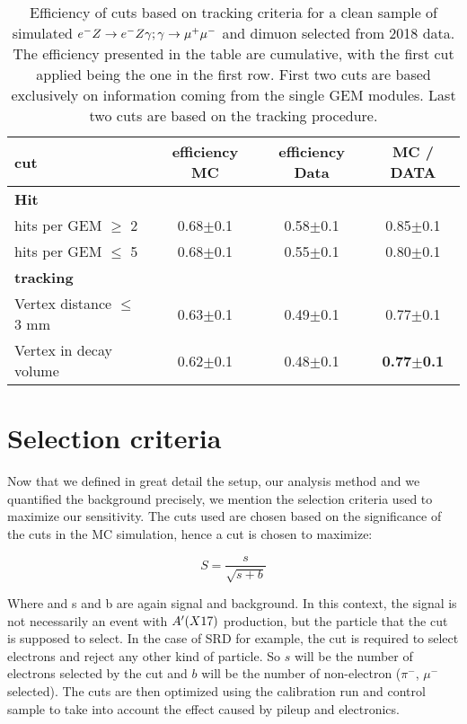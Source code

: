 \begin{center}
\begin{table}
  \begin{tabular}{|l|c|c|c|}
    \hline
    cut & efficiency MC & efficiency Data & MC / DATA \\
    \hline
    \textbf{Hit} & & &\\
    \hline
    hits per GEM $\geq$ 2 & 0.68$\pm$0.1 & 0.58$\pm$0.1 & 0.85$\pm$0.1 \\
    hits per GEM $\leq$ 5 & 0.68$\pm$0.1 & 0.55$\pm$0.1 & 0.80$\pm$0.1 \\
    \hline
    \textbf{tracking} & & &\\
    \hline
    Vertex distance $\leq$ 3 mm & 0.63$\pm$0.1 & 0.49$\pm$0.1 & 0.77$\pm$0.1  \\
    Vertex in decay volume & 0.62$\pm$0.1 & 0.48$\pm$0.1 & \textbf{0.77$\pm$0.1}\\
    \hline
    
  \end{tabular}
  \caption[MC/DATA for the tracking procedure and vertex reconstruction]{Efficiency of cuts based on tracking criteria for a clean sample of simulated $e^- Z \to e^- Z \gamma; \gamma \to \mu^+ \mu^-$ and dimuon selected from 2018 data. The efficiency presented in the table are cumulative, with the first cut applied being the one in the first row. First two cuts are based exclusively on information coming from the single GEM modules. Last two cuts are based on the tracking procedure.}
  \label{tab:dimuon:efficiencies}
\end{table}
\end{center}

\section{Selection criteria}
\label{ch3:sec:selection-criteria}

Now that we defined in great detail the setup, our analysis method and we quantified the background precisely, we mention the selection criteria used to maximize our sensitivity. The cuts used are chosen based on the significance of the cuts in the MC simulation, hence a cut is chosen to maximize:

\begin{equation}
  \label{eq:significance}
  S = \frac{s}{\sqrt{s + b}}
\end{equation}

Where and s and b are again signal and background. In this context, the signal is not necessarily an event with $A'(X17)$ production, but the particle that the cut is supposed to select. In the case of SRD for example, the cut is required to select electrons and reject any other kind of particle. So $s$ will be the number of electrons selected by the cut and $b$ will be the number of non-electron ($\pi^-$, $\mu^-$ selected). The cuts are then optimized using the calibration run and control sample to take into account the effect caused by pileup and electronics.


